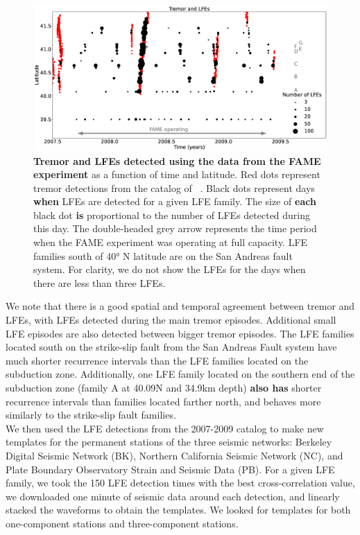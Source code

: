 \documentclass[draft]{agujournal2019}
\begin{document}
\begin{figure}
\noindent\includegraphics[width=\textwidth, trim={0cm 0cm 0cm 0cm},clip]{figures/tremor_nb_FAME_3.eps}
\caption{\textbf{Tremor and LFEs detected using the data from the FAME experiment} as a function of time and latitude. Red dots represent tremor detections from the catalog of ~. Black dots represent days \textbf{when} LFEs are detected for a given LFE family. The size of \textbf{each} black dot \textbf{is} proportional to the number of LFEs detected during this day. The double-headed grey arrow represents the time period when the FAME experiment was operating at full capacity. LFE families south of 40° N latitude are on the San Andreas fault system. For clarity, we do not show the LFEs for the days when there are less than three LFEs.}
\label{pngfiguresample}
\end{figure}

We note that there is a good spatial and temporal agreement between tremor and LFEs, with LFEs detected during the main tremor episodes. Additional small LFE episodes are also detected between bigger tremor episodes. The LFE families located south on the strike-slip fault from the San Andreas Fault system have much shorter recurrence intervals than the LFE families located on the subduction zone. Additionally, one LFE family located on the southern end of the subduction zone (family A at 40.09N and 34.9km depth) \textbf{also has} shorter recurrence intervals than families located farther north, and behaves more similarly to the strike-slip fault families. \\

We then used the LFE detections from the 2007-2009 catalog to make new templates for the permanent stations of the three seismic networks: Berkeley Digital Seismic Network (BK), Northern California Seismic Network (NC), and Plate Boundary Observatory Strain and Seismic Data (PB). For a given LFE family, we took the 150 LFE detection times with the best cross-correlation value, we downloaded one minute of seismic data around each detection, and linearly stacked the waveforms to obtain the templates. We looked for templates for both one-component stations and three-component stations. \\
\end{document}
